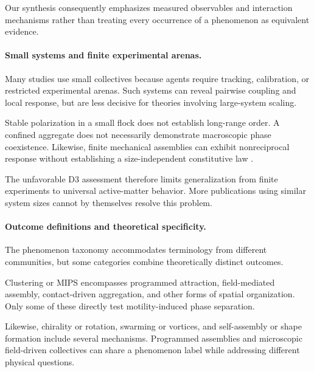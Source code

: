 Our synthesis consequently emphasizes
measured observables and interaction mechanisms
rather than treating every occurrence
of a phenomenon as equivalent evidence.

\paragraph*{Small systems and finite experimental arenas.}

Many studies use small collectives because
agents require tracking, calibration,
or restricted experimental arenas.
Such systems can reveal pairwise coupling
and local response, but are less decisive
for theories involving large-system scaling.

Stable polarization in a small flock
does not establish long-range order.
A confined aggregate does not necessarily
demonstrate macroscopic phase coexistence.
Likewise, finite mechanical assemblies
can exhibit nonreciprocal response
without establishing a size-independent
constitutive law
\cite{Brandenbourger2019nonreciprocalrobot,Brandenbourger2021limitcyclesturnac,Binysh2026moreislessinunpe,Coulais2025activemetamaterials}.

The unfavorable D3 assessment therefore
limits generalization from finite experiments
to universal active-matter behavior.
More publications using similar system sizes
cannot by themselves resolve this problem.

\paragraph*{Outcome definitions and theoretical specificity.}

The phenomenon taxonomy accommodates terminology
from different communities, but some categories
combine theoretically distinct outcomes.

Clustering or MIPS encompasses programmed
attraction, field-mediated assembly,
contact-driven aggregation, and other
forms of spatial organization. Only some
of these directly test motility-induced
phase separation.

Likewise, chirality or rotation,
swarming or vortices, and self-assembly
or shape formation include several
mechanisms. Programmed assemblies
\cite{Rubenstein2014programmableselfas,Li2019particleroboticsba,Yi2025reconfigurablerobot}
and microscopic field-driven collectives
\cite{Pauer2021programmabledesign,Sun2024multiplemagnetoopt,Cheng2025selfassemblyandco}
can share a phenomenon label while
addressing different physical questions.

